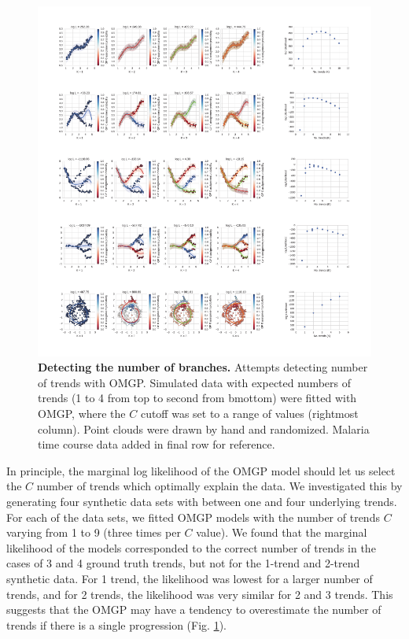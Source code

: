 \begin{figure}
    \centering
    \includegraphics[width=\textwidth]{"num-trends-rasterized"}
    \caption[Detecting the number of branches]{\textbf{Detecting the number of branches.} Attempts detecting number of trends with OMGP. Simulated data with expected numbers of trends (1 to 4 from top to second from bmottom) were fitted with OMGP, where the \( C \) cutoff was set to a range of values (rightmost column). Point clouds were drawn by hand and randomized. Malaria time course data added in final row for reference.}
    \label{fig:numtrends}
\end{figure}

In principle, the marginal log likelihood of the OMGP model should let us select the $ C $ number of trends which optimally explain the data. We investigated this by generating four synthetic data sets with between one and four underlying trends. For each of the data sets, we fitted OMGP models with the number of trends $ C $ varying from 1 to 9 (three times per $ C $ value). We found that the marginal likelihood of the models corresponded to the correct number of trends in the cases of 3 and 4 ground truth trends, but not for the 1-trend and 2-trend synthetic data. For 1 trend, the likelihood was lowest for a larger number of trends, and for 2 trends, the likelihood was very similar for 2 and 3 trends. This suggests that the OMGP may have a tendency to overestimate the number of trends if there is a single progression (Fig. \ref{fig:numtrends}).

